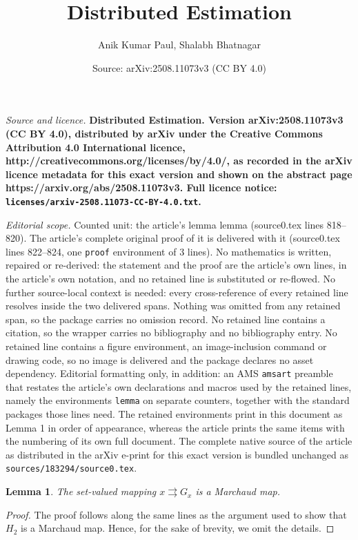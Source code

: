 \documentclass[10pt,a4paper]{amsart}
\title{\LARGE \bf Distributed Estimation}
\author{Anik Kumar Paul, Shalabh Bhatnagar}
\date{Source: arXiv:2508.11073v3 (CC BY 4.0)}
\newtheorem{lemma}{Lemma}
\begin{document}
\maketitle

\noindent\emph{Source and licence.} \LARGE \bf Distributed Estimation. Version arXiv:2508.11073v3 (CC BY 4.0), distributed by arXiv under the Creative Commons Attribution 4.0 International licence, http://creativecommons.org/licenses/by/4.0/, as recorded in the arXiv licence metadata for this exact version and shown on the abstract page https://arxiv.org/abs/2508.11073v3. Full licence notice: \texttt{licenses/arxiv-2508.11073-CC-BY-4.0.txt}.\par\smallskip

\noindent\textit{Editorial scope.} Counted unit: the article's lemma lemma (source0.tex lines 818--820). The article's complete original proof of it is delivered with it (source0.tex lines 822--824, one \texttt{proof} environment of 3 lines). No mathematics is written, repaired or re-derived: the statement and the proof are the article's own lines, in the article's own notation, and no retained line is substituted or re-flowed.  No further source-local context is needed: every cross-reference of every retained line resolves inside the two delivered spans.  Nothing was omitted from any retained span, so the package carries no omission record.  No retained line contains a citation, so the wrapper carries no bibliography and no bibliography entry.  No retained line contains a figure environment, an image-inclusion command or drawing code, so no image is delivered and the package declares no asset dependency.  Editorial formatting only, in addition: an AMS \texttt{amsart} preamble that restates the article's own declarations and macros used by the retained lines, namely the environments \texttt{lemma} on separate counters, together with the standard packages those lines need.  The retained environments print in this document as Lemma 1 in order of appearance, whereas the article prints the same items with the numbering of its own full document.  The complete native source of the article as distributed in the arXiv e-print for this exact version is bundled unchanged as \texttt{sources/183294/source0.tex}.
\begin{lemma}
    The set-valued mapping $x \rightrightarrows G_x$ is a Marchaud map. 
\end{lemma}

\begin{proof}
   The proof follows along the same lines as the argument used to show that $H_2$ is a Marchaud map. Hence, for the sake of brevity, we omit the details.
\end{proof}
\end{document}
